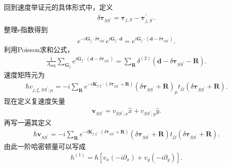 \documentclass[10pt, oneside]{article}
\begin{document}
回到速度举证元的具体形式中，定义
\begin{align}
	\boxed{
		\delta \bm{\tau}_{SS^{\prime}} = \bm{\tau}_{j,S} - \bm{\tau}^{\prime}_{j, S^{\prime}}.
	}
\end{align}
整理e指数得到
\begin{align}
	e^{-i \bm{G}_{j} \cdot \delta \bm{\tau}_{SS^{\prime}}} e^{	i \bm{G}_{j} \cdot\bm{d }} = e^{i \bm{G}_{j} \cdot \left(\bm{d } - \delta \bm{\tau}_{SS^\prime}\right)}.
\end{align}
利用Poisson求和公式，
\begin{align}
	\frac{1}{A_{\mathrm{mlg}}} \sum_{\bm{G}_{j}} e^{i \bm{G}_{j} \cdot \left(\bm{d} - \delta \bm{\tau}_{SS^{\prime}}\right)} = \sum_{\bm{R}} \delta^{\left(2\right)} \left(\bm{d } - \delta \bm{\tau}_{SS^{\prime}} - \bm{R} \right) .
\end{align}
速度矩阵元为
\begin{align}
	\boxed{
		\hbar v_{j,\xi, SS^{\prime};\mu} = -i \sum_{\bm{R}} e^{-i \bm{K }_{j,\xi} \cdot \left( \delta \bm{\tau}_{SS^{\prime}} + \bm{R}\right)} \left( \delta \bm{\tau}_{SS^{\prime}} + \bm{R}\right)_{\mu} t_{jj} \left( \delta \bm{\tau}_{SS^{\prime}} + \bm{R}\right).
	}
\end{align}
现在定义复速度矢量
\begin{align}
	\bm{v }_{SS^{\prime}} = v_{SS^{\prime};x} \hat{x} + v_{SS^{\prime};y} \hat{y}.
\end{align}
再写一遍其定义
\begin{align}
	\hbar \bm{v }_{SS^{\prime}} = -i \sum_{\bm{R}} e^{-i \bm{K }_{j,\xi} \cdot \left( \delta \bm{\tau}_{SS^{\prime}} + \bm{R}\right)} \left( \delta \bm{\tau}_{SS^{\prime}} + \bm{R}\right) t_{jj} \left( \delta \bm{\tau}_{SS^{\prime}} + \bm{R}\right).
\end{align}
由此一阶哈密顿量可以写成
\begin{align}
	h^{\left(1\right)} = \hbar \left[v_x \left(-i \partial_{x }\right) + v_y \left(-i \partial_{y}\right)\right].
\end{align}
\end{document}
